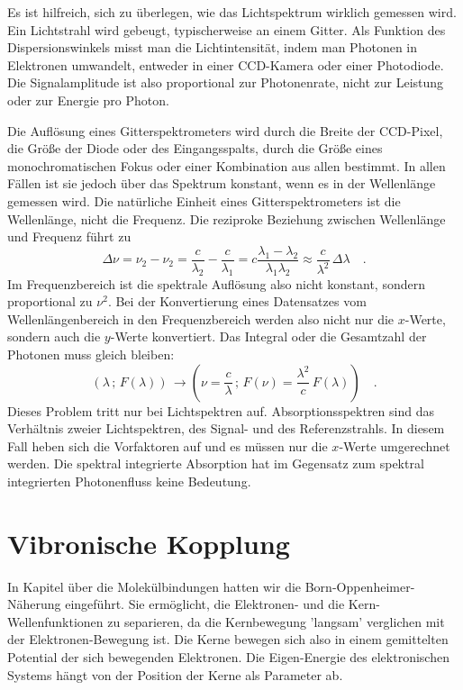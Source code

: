 Es ist hilfreich, sich zu überlegen, wie das Lichtspektrum wirklich gemessen wird. Ein Lichtstrahl wird gebeugt, typischerweise an einem Gitter. Als Funktion des Dispersionswinkels misst man die Lichtintensität, indem man Photonen in Elektronen umwandelt, entweder in einer CCD-Kamera oder einer Photodiode. Die Signalamplitude ist also proportional zur Photonenrate, nicht zur Leistung oder zur Energie pro Photon.

Die Auflösung eines Gitterspektrometers wird durch die Breite der CCD-Pixel, die Größe der Diode oder des Eingangsspalts, durch die Größe eines monochromatischen Fokus oder einer Kombination aus allen bestimmt. In allen Fällen ist sie jedoch über das Spektrum konstant, wenn es in der Wellenlänge gemessen wird. Die natürliche Einheit eines Gitterspektrometers ist die Wellenlänge, nicht die Frequenz. Die reziproke Beziehung zwischen Wellenlänge und Frequenz führt zu 
\begin{equation}
 \Delta \nu = \nu_2 - \nu_2 = \frac{c}{\lambda_2} - \frac{c}{\lambda_1}  = c \frac{\lambda_1 - \lambda_2}{\lambda_1 \lambda_2} \approx \frac{c}{\lambda^2} \, \Delta \lambda \quad .
\end{equation}
Im Frequenzbereich ist die spektrale Auflösung also nicht konstant, sondern proportional zu $\nu^2$. Bei der Konvertierung eines Datensatzes vom Wellenlängenbereich in den Frequenzbereich werden also nicht nur die $x$-Werte, sondern auch die $y$-Werte konvertiert. Das Integral oder die Gesamtzahl der Photonen muss gleich bleiben:
\begin{equation}
 \left( \lambda \, ; \, F(\lambda) \right) \, \rightarrow  \left( \nu = \frac{c}{ \lambda} \, ; \,  F(\nu) = \frac{\lambda^2}{ c } \, F(\lambda) \right)  \quad .
\end{equation}
Dieses Problem tritt nur bei Lichtspektren auf. Absorptionsspektren sind das Verhältnis zweier Lichtspektren, des Signal- und des Referenzstrahls. In diesem Fall heben sich die Vorfaktoren auf und es müssen nur die $x$-Werte umgerechnet werden. Die spektral integrierte Absorption hat im Gegensatz zum spektral integrierten Photonenfluss keine Bedeutung.



\section{Vibronische Kopplung}

In Kapitel über die Molekülbindungen hatten wir die Born-Oppenheimer-Näherung eingeführt. Sie ermöglicht, die Elektronen- und die Kern-Wellen\-funk\-tionen zu separieren, da die Kernbewegung 'langsam' verglichen mit der Elektronen-Bewegung ist. Die Kerne bewegen sich also in einem gemittelten Potential der sich bewegenden Elektronen. Die Eigen-Energie des elektronischen Systems hängt von der Position der Kerne als Parameter ab.

